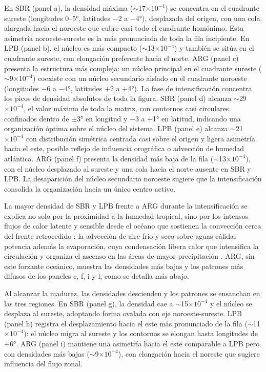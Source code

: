 En SBR (panel a), la densidad máxima ($\sim$17$\times10^{-4}$) se concentra en el cuadrante sureste (longitudes 0--5°, latitudes $-$2 a $-$4°), desplazada del origen, con una cola alargada hacia el noroeste que cubre casi todo el cuadrante homónimo. Esta asimetría noroeste-sureste es la más pronunciada de toda la fila incipiente. En LPB (panel b), el núcleo es más compacto ($\sim$13$\times10^{-4}$) y también se sitúa en el cuadrante sureste, con elongación preferente hacia el norte. 
ARG (panel c) presenta la estructura más compleja: un núcleo principal en el cuadrante sureste ($\sim$9$\times10^{-4}$) coexiste con un núcleo secundario aislado en el cuadrante noroeste (longitudes $-$6 a $-$4°, latitudes $+$2 a $+$4°). 
La fase de intensificación concentra los picos de densidad absolutos de toda la figura. SBR (panel d) alcanza $\sim$29$\times10^{-4}$, el valor máximo de toda la matriz, con contornos casi circulares confinados dentro de $\pm$3° en longitud y $-$3 a $+$1° en latitud, indicando una organización óptima sobre el núcleo del sistema. LPB (panel e) alcanza $\sim$21$\times10^{-4}$ con distribución simétrica centrada casi sobre el origen y ligera asimetría hacia el este, posible reflejo de influencia orográfica o advección de humedad atlántica. ARG (panel f) presenta la densidad más baja de la fila ($\sim$13$\times10^{-4}$), con el núcleo desplazado al sureste y una cola hacia el norte ausente en SBR y LPB. La desaparición del núcleo secundario noroeste sugiere que la intensificación consolida la organización hacia un único centro activo.

La mayor densidad de SBR y LPB frente a ARG durante la intensificación se explica no solo por la proximidad a la humedad tropical, sino por los intensos flujos de calor latente y sensible desde el océano que sostienen la convección cerca del frente retrocedido \citep{gozzo2013air}; la advección de aire frío y seco sobre aguas cálidas potencia además la evaporación, cuya condensación libera calor que intensifica la circulación y organiza el ascenso en las áreas de mayor precipitación \citep{andrade2024composite}. ARG, sin este forzante oceánico, muestra las densidades más bajas y los patrones más difusos de los paneles c, f, i y l, como se detalla más abajo.

Al alcanzar la madurez, las densidades descienden y los patrones se ensanchan en las tres regiones. En SBR (panel g), la densidad cae a $\sim$15$\times10^{-4}$ y el núcleo se desplaza al sureste, adoptando forma ovalada con eje noroeste-sureste. LPB (panel h) registra el desplazamiento hacia el este más pronunciado de la fila ($\sim$11$\times10^{-4}$): el núcleo migra al sureste y los contornos se elongan hasta longitudes de $+$6°. ARG (panel i) mantiene una asimetría hacia el este comparable a LPB pero con densidades más bajas ($\sim$9$\times10^{-4}$), con elongación hacia el noreste que sugiere influencia del flujo zonal.

